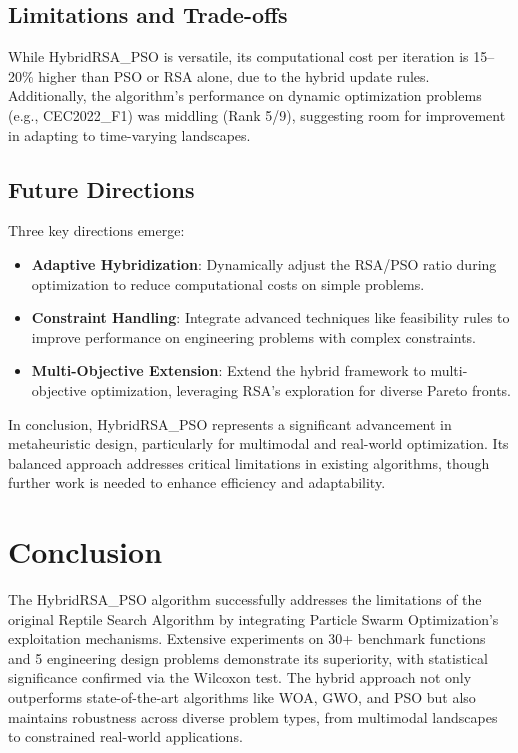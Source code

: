 \documentclass[12pt]{article}
\begin{document}
\subsection*{Limitations and Trade-offs}
While HybridRSA\_PSO is versatile, its computational cost per iteration is 15–20\% higher than PSO or RSA alone, due to the hybrid update rules. Additionally, the algorithm’s performance on dynamic optimization problems (e.g., CEC2022\_F1) was middling (Rank 5/9), suggesting room for improvement in adapting to time-varying landscapes.

\subsection*{Future Directions}
Three key directions emerge:
\begin{itemize}
    \item \textbf{Adaptive Hybridization}: Dynamically adjust the RSA/PSO ratio during optimization to reduce computational costs on simple problems.
    \item \textbf{Constraint Handling}: Integrate advanced techniques like feasibility rules to improve performance on engineering problems with complex constraints.
    \item \textbf{Multi-Objective Extension}: Extend the hybrid framework to multi-objective optimization, leveraging RSA’s exploration for diverse Pareto fronts.
\end{itemize}

In conclusion, HybridRSA\_PSO represents a significant advancement in metaheuristic design, particularly for multimodal and real-world optimization. Its balanced approach addresses critical limitations in existing algorithms, though further work is needed to enhance efficiency and adaptability.


\section{Conclusion}  
The HybridRSA\_PSO algorithm successfully addresses the limitations of the original Reptile Search Algorithm by integrating Particle Swarm Optimization's exploitation mechanisms. Extensive experiments on 30+ benchmark functions and 5 engineering design problems demonstrate its superiority, with statistical significance confirmed via the Wilcoxon test. The hybrid approach not only outperforms state-of-the-art algorithms like WOA, GWO, and PSO but also maintains robustness across diverse problem types, from multimodal landscapes to constrained real-world applications.  
\end{document}
